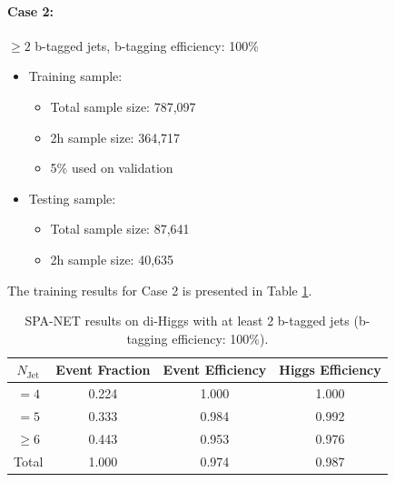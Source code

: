 \documentclass[12pt]{article}
\begin{document}
		\paragraph{Case 2:} $\ge 2$ b-tagged jets, b-tagging efficiency: 100\% 
		\begin{itemize}
			\item Training sample:
			\begin{itemize}
				\item Total sample size: 787,097
				\item 2h sample size: 364,717
				\item 5\% used on validation
			\end{itemize}
			\item Testing sample: 
				\begin{itemize}
					\item Total sample size: 87,641
					\item 2h sample size: 40,635
				\end{itemize}
		\end{itemize}
		The training results for Case 2 is presented in Table \ref{tab:SPANet_2btag_100}.
		\begin{table}[htpb]
			\centering
			\caption{SPA-NET results on di-Higgs with at least 2 b-tagged jets (b-tagging efficiency: 100\%).}
			\label{tab:SPANet_2btag_100}
			\begin{tabular}{c|c|cc}
				$N_\text{Jet}$ & Event Fraction & Event Efficiency & Higgs Efficiency \\
				\hline
				$=4$	  &   0.224             &    1.000              &    1.000             \\
				$=5$	  &   0.333             &    0.984              &    0.992             \\
				$\ge 6$	  &   0.443             &    0.953              &    0.976             \\
				Total	  &   1.000             &    0.974              &    0.987             \\
			\end{tabular}
		\end{table}
\end{document}
